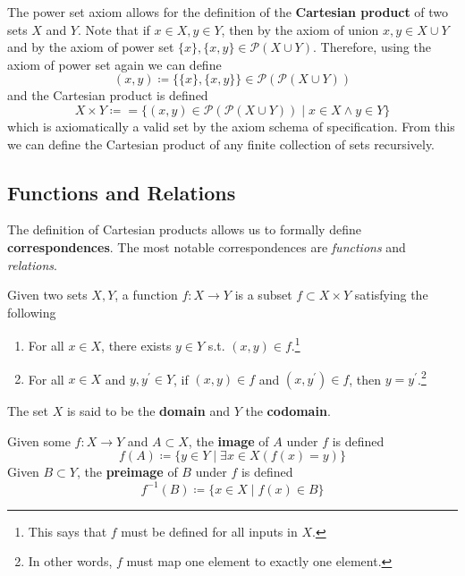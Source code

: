 \documentclass{article}
\begin{document}
    \begin{definition}
      The power set axiom allows for the definition of the \textbf{Cartesian product} of two sets $X$ and $Y$. Note that if $x \in X, y \in Y$, then by the axiom of union $x, y \in X \cup Y$ and by the axiom of power set $\{x\}, \{x, y\} \in \mathcal{P}(X \cup Y)$. Therefore, using the axiom of power set again we can define
      \begin{equation}
        (x, y) \coloneqq \{\{x\}, \{x, y\}\} \in \mathcal{P}(\mathcal{P}(X \cup Y))
      \end{equation} 
      and the Cartesian product is defined 
      \begin{equation}
        X \times Y \coloneqq = \{ (x, y) \in \mathcal{P}(\mathcal{P}(X \cup Y))  \mid x \in X \land y \in Y \}
      \end{equation}
      which is axiomatically a valid set by the axiom schema of specification. From this we can define the Cartesian product of any finite collection of sets recursively. 
    \end{definition}

  \subsection{Functions and Relations} 

    The definition of Cartesian products allows us to formally define \textbf{correspondences}. The most notable correspondences are \textit{functions} and \textit{relations}. 

    \begin{definition}[Function]
      Given two sets $X, Y$, a function $f: X \rightarrow Y$ is a subset $f \subset X \times Y$ satisfying the following
      \begin{enumerate}
        \item For all $x \in X$, there exists $y \in Y$ s.t. $(x, y) \in f$.\footnote{This says that $f$ must be defined for all inputs in $X$.}
        \item For all $x \in X$ and $y, y^\prime \in Y$, if $(x, y) \in f$ and $(x, y^\prime) \in f$, then $y = y^\prime$.\footnote{In other words, $f$ must map one element to exactly one element.} 
      \end{enumerate}
      The set $X$ is said to be the \textbf{domain} and $Y$ the \textbf{codomain}. 
    \end{definition} 

    \begin{definition}
      Given some $f: X \rightarrow Y$ and $A \subset X$, the \textbf{image} of $A$ under $f$ is defined 
      \begin{equation}
        f(A) \coloneqq \{y \in Y \mid \exists x \in X (f(x) = y)\}
      \end{equation}
      Given $B \subset Y$, the \textbf{preimage} of $B$ under $f$ is defined 
      \begin{equation}
        f^{-1} (B) \coloneqq \{ x \in X \mid f(x) \in B \}
      \end{equation}
    \end{definition} 
\end{document}
